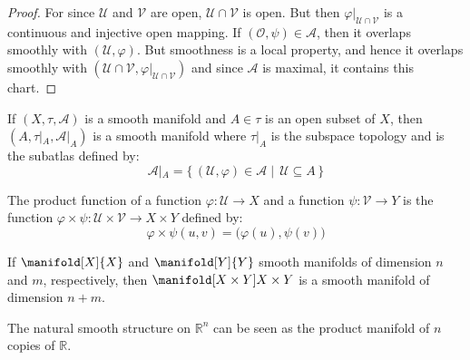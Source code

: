 \documentclass{article}                                                        %
\begin{document}
        \begin{proof}
            For since $\mathcal{U}$ and $\mathcal{V}$ are open,
            $\mathcal{U}\cap\mathcal{V}$ is open. But then
            $\varphi|_{\mathcal{U}\cap\mathcal{V}}$ is a continuous and
            injective open mapping. If $(\mathcal{O},\psi)\in\mathcal{A}$, then
            it overlaps smoothly with $(\mathcal{U},\varphi)$. But smoothness
            is a local property, and hence it overlaps smoothly with
            $(\mathcal{U}\cap\mathcal{V},\varphi|_{\mathcal{U}\cap\mathcal{V}})$
            and since $\mathcal{A}$ is maximal, it contains this chart.
        \end{proof}
        \begin{theorem}
            If $(X,\tau,\mathcal{A})$ is a smooth manifold and $A\in\tau$ is an
            open subset of $X$, then $(A,\tau|_{A},\mathcal{A}|_{A})$ is a
            smooth manifold where $\tau|_{A}$ is the subspace topology and
            is the subatlas defined by:
            \begin{equation}
                \mathcal{A}|_{A}=
                \{\,(\mathcal{U},\varphi)\in\mathcal{A}\;|\;\,
                    \mathcal{U}\subseteq{A}\,\}
            \end{equation}
        \end{theorem}
        \begin{definition}
            The product function of a function
            $\varphi:\mathcal{U}\rightarrow{X}$ and a function
            $\psi:\mathcal{V}\rightarrow{Y}$ is the function
            $\varphi\times\psi:%
             \mathcal{U}\times\mathcal{V}\rightarrow{X}\times{Y}$ defined by:
             \begin{equation*}
                \varphi\times\psi(u,v)=\big(\varphi(u),\psi(v)\big)
             \end{equation*}
        \end{definition}
        \begin{theorem}
            If $\manifold[X]{X}$ and $\manifold[Y]{Y}$ smooth manifolds of
            dimension $n$ and $m$, respectively, then
            $\manifold[X\times{Y}]{X\times{Y}}$ is a smooth manifold of
            dimension $n+m$.
        \end{theorem}
        The natural smooth structure on $\mathbb{R}^{n}$ can be seen as the
        product manifold of $n$ copies of $\mathbb{R}$.
\end{document}
